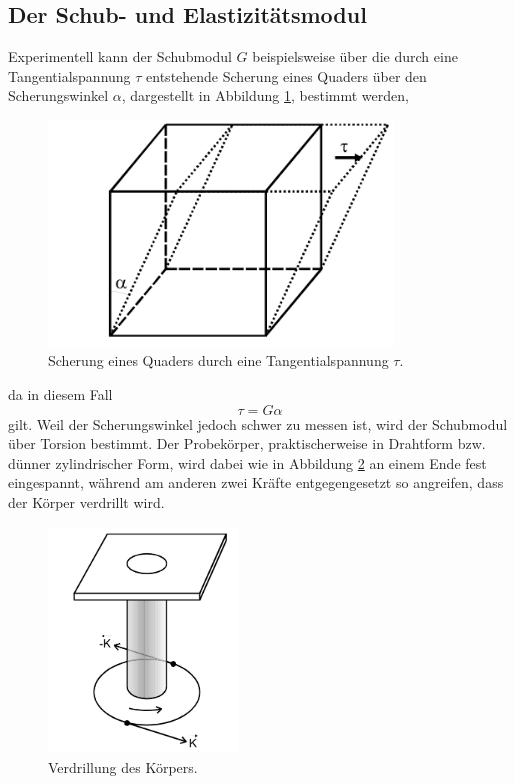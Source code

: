 \subsection{Der Schub- und Elastizitätsmodul}
Experimentell kann der Schubmodul $G$ beispielsweise über die durch eine Tangentialspannung $\tau$ entstehende Scherung eines Quaders über den Scherungswinkel $\alpha$, dargestellt in Abbildung \ref{fig:1}, bestimmt werden,
\begin{figure}[H]
  \centering
  \includegraphics[height=6cm]{scherung1.png}
  \caption{Scherung eines Quaders durch eine Tangentialspannung $\tau$. \cite{sample}}
  \label{fig:1}
\end{figure}
da in diesem Fall
\begin{equation}
  \tau = G \alpha \label{eqn:3}
\end{equation}
gilt.
Weil der Scherungswinkel jedoch schwer zu messen ist, wird der Schubmodul über Torsion bestimmt.
Der Probekörper, praktischerweise in Drahtform bzw. dünner zylindrischer Form, wird dabei wie in Abbildung \ref{fig:2} an einem Ende fest eingespannt, während am anderen zwei Kräfte entgegengesetzt so angreifen, dass der Körper verdrillt wird.
\begin{figure}[H]
  \centering
  \includegraphics[height=6cm]{scherung2.png}
  \caption{Verdrillung des Körpers. \cite{sample}}
  \label{fig:2}
\end{figure}
